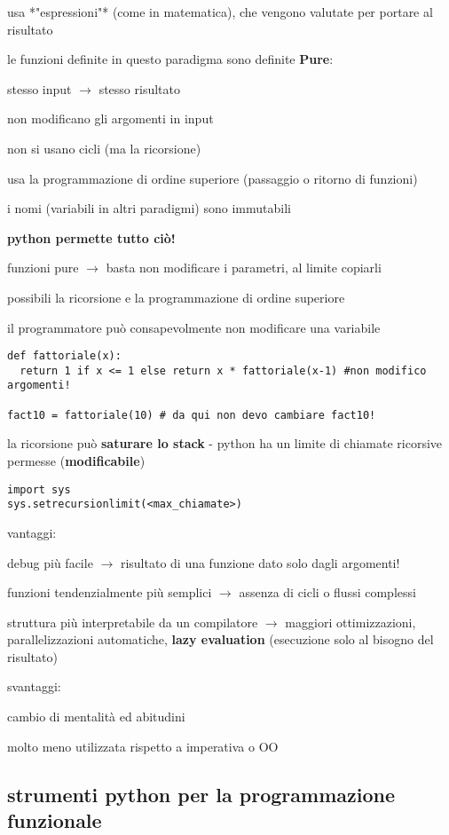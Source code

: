 usa *"espressioni"* (come in matematica), che vengono valutate per portare al risultato

le funzioni definite in questo paradigma sono definite \textbf{Pure}:

stesso input $\rightarrow$ stesso risultato

non modificano gli argomenti in input

non si usano cicli (ma la ricorsione)

usa la programmazione di ordine superiore (passaggio o ritorno di funzioni)

i nomi (variabili in altri paradigmi) sono immutabili

\textbf{python permette tutto ci\`o!}

funzioni pure $\rightarrow$ basta non modificare i parametri, al limite copiarli

possibili la ricorsione e la programmazione di ordine superiore

il programmatore pu\`o consapevolmente non modificare una variabile

\begin{verbatim}
def fattoriale(x):
  return 1 if x <= 1 else return x * fattoriale(x-1) #non modifico argomenti!

fact10 = fattoriale(10) # da qui non devo cambiare fact10!
\end{verbatim}

la ricorsione pu\`o \textbf{saturare lo stack} - python ha un limite di chiamate ricorsive permesse (\textbf{modificabile})

\begin{verbatim}
import sys
sys.setrecursionlimit(<max_chiamate>)
\end{verbatim}

vantaggi:

debug pi\`u facile $\rightarrow$ risultato di una funzione dato solo dagli argomenti!

funzioni tendenzialmente pi\`u semplici $\rightarrow$ assenza di cicli o flussi complessi

struttura pi\`u interpretabile da un compilatore $\rightarrow$ maggiori ottimizzazioni, parallelizzazioni automatiche, \textbf{lazy evaluation} (esecuzione solo al bisogno del risultato)

svantaggi:

cambio di mentalit\`a ed abitudini

molto meno utilizzata rispetto a imperativa o OO

\subsection{strumenti python per la programmazione funzionale}

